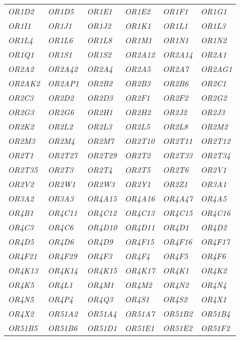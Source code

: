 \begin{longtable}{>{\em}l>{\em}l>{\em}l>{\em}l>{\em}l>{\em}l}
  \rowcolor{black!10} 
  OR1D2 & OR1D5 & OR1E1 & OR1E2 & OR1F1 & OR1G1 \\ 
  \rowcolor{black!5} 
  OR1I1 & OR1J1 & OR1J2 & OR1K1 & OR1L1 & OR1L3 \\ 
  \rowcolor{black!10} 
  OR1L4 & OR1L6 & OR1L8 & OR1M1 & OR1N1 & OR1N2 \\ 
  \rowcolor{black!5} 
  OR1Q1 & OR1S1 & OR1S2 & OR2A12 & OR2A14 & OR2A1 \\ 
  \rowcolor{black!10} 
  OR2A2 & OR2A42 & OR2A4 & OR2A5 & OR2A7 & OR2AG1 \\ 
  \rowcolor{black!5} 
  OR2AK2 & OR2AP1 & OR2B2 & OR2B3 & OR2B6 & OR2C1 \\ 
  \rowcolor{black!10} 
  OR2C3 & OR2D2 & OR2D3 & OR2F1 & OR2F2 & OR2G2 \\ 
  \rowcolor{black!5} 
  OR2G3 & OR2G6 & OR2H1 & OR2H2 & OR2J2 & OR2J3 \\ 
  \rowcolor{black!10} 
  OR2K2 & OR2L2 & OR2L3 & OR2L5 & OR2L8 & OR2M2 \\ 
  \rowcolor{black!5} 
  OR2M3 & OR2M4 & OR2M7 & OR2T10 & OR2T11 & OR2T12 \\ 
  \rowcolor{black!10} 
  OR2T1 & OR2T27 & OR2T29 & OR2T2 & OR2T33 & OR2T34 \\ 
  \rowcolor{black!5} 
  OR2T35 & OR2T3 & OR2T4 & OR2T5 & OR2T6 & OR2V1 \\ 
  \rowcolor{black!10} 
  OR2V2 & OR2W1 & OR2W3 & OR2Y1 & OR2Z1 & OR3A1 \\ 
  \rowcolor{black!5} 
  OR3A2 & OR3A3 & OR4A15 & OR4A16 & OR4A47 & OR4A5 \\ 
  \rowcolor{black!10} 
  OR4B1 & OR4C11 & OR4C12 & OR4C13 & OR4C15 & OR4C16 \\ 
  \rowcolor{black!5} 
  OR4C3 & OR4C6 & OR4D10 & OR4D11 & OR4D1 & OR4D2 \\ 
  \rowcolor{black!10} 
  OR4D5 & OR4D6 & OR4D9 & OR4F15 & OR4F16 & OR4F17 \\ 
  \rowcolor{black!5} 
  OR4F21 & OR4F29 & OR4F3 & OR4F4 & OR4F5 & OR4F6 \\ 
  \rowcolor{black!10} 
  OR4K13 & OR4K14 & OR4K15 & OR4K17 & OR4K1 & OR4K2 \\ 
  \rowcolor{black!5} 
  OR4K5 & OR4L1 & OR4M1 & OR4M2 & OR4N2 & OR4N4 \\ 
  \rowcolor{black!10} 
  OR4N5 & OR4P4 & OR4Q3 & OR4S1 & OR4S2 & OR4X1 \\ 
  \rowcolor{black!5} 
  OR4X2 & OR51A2 & OR51A4 & OR51A7 & OR51B2 & OR51B4 \\ 
  \rowcolor{black!10} 
  OR51B5 & OR51B6 & OR51D1 & OR51E1 & OR51E2 & OR51F2 \\ 

\end{longtable}
